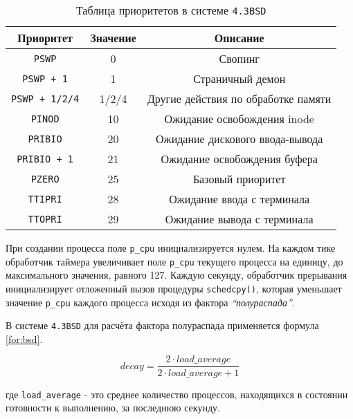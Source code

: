 \documentclass[a4paper,12pt]{bmstu}
\begin{document}
\begin{table}[h]
    \caption{Таблица приоритетов в системе \texttt{4.3BSD}}
    \label{tab:bsd}
    \begin{center}
        \begin{tabular}{ |c|c|c| }
            \hline
            \textbf{Приоритет} & \textbf{Значение} & \textbf{Описание} \\
            \hline
            \texttt{PSWP} & 0 & Свопинг \\
            \hline
            \texttt{PSWP + 1} & 1 & Страничный демон \\
            \hline
            \texttt{PSWP + 1/2/4} & 1/2/4 & Другие действия по обработке памяти \\
            \hline
            \texttt{PINOD} & 10 & Ожидание освобождения inode \\
            \hline
            \texttt{PRIBIO} & 20 & Ожидание дискового ввода-вывода \\
            \hline
            \texttt{PRIBIO + 1} & 21 & Ожидание освобождения буфера \\
            \hline
            \texttt{PZERO} & 25 & Базовый приоритет \\
            \hline
            \texttt{TTIPRI} & 28 & Ожидание ввода с терминала \\
            \hline
            \texttt{TTOPRI} & 29 & Ожидание вывода с терминала \\
            \hline
        \end{tabular}
    \end{center}
\end{table}

При создании процесса поле \texttt{p\_cpu} инициализируется нулем. На каждом тике обработчик таймера увеличивает поле \texttt{p\_cpu} текущего процесса на единицу, до максимального значения, равного 127. Каждую секунду, обработчик прерывания инициализирует отложенный вызов процедуры \texttt{schedcpy()}, которая уменьшает значение \texttt{p\_cpu} каждого процесса исходя из фактора \textit{``полураспада''}.

В системе \texttt{4.3BSD} для расчёта фактора полураспада применяется формула \eqref{for:bsd}.

\begin{equation}
    \label{for:bsd}
    decay = \frac{2 \cdot load\_average}{2 \cdot load\_average + 1}
\end{equation}

где \texttt{load\_average} - это среднее количество процессов, находящихся в состоянии готовности к выполнению, за последнюю секунду.
\end{document}
